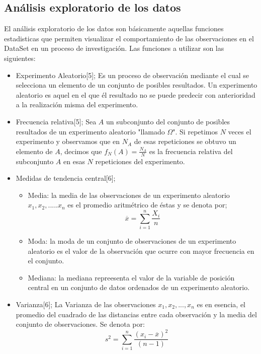   
  \subsection{Análisis exploratorio de los datos}
  
  El análisis exploratorio de los datos son básicamente aquellas funciones estadisticas que permiten visualizar el comportamiento de las observaciones en el DataSet en un proceso de investigación. Las funciones a utilizar son las siguientes: 
  \begin{itemize}
  	\item Experimento Aleatorio[5]; Es un proceso de observación mediante el cual se selecciona un elemento de un conjunto de posibles resultados. Un experimento aleatorio es aquel en el que él resultado no se puede predecir con anterioridad a la realización misma del experimento. 
  	
   \item Frecuencia relativa[5]; Sea $A$ un subconjunto del conjunto de posibles resultados de un experimento aleatorio "llamado $\Omega$". Si repetimos $N$ veces el experimento y observamos que en $N_{A}$ de esas repeticiones se obtuvo un elemento de $A$, decimos que $f_{N}(A)=\frac{N_{A}}{N}$ es la frecuencia relativa del subconjunto $A$ en esas $N$  repeticiones del experimento.

    \item Medidas de tendencia central[6]; 
	   \begin{itemize}
		 	\item Media: la media de las observaciones de un experimento aleatorio $x_{1},x_{2},.....x_{n}$ es el promedio aritm\'etrico de \'estas y se denota por;
		 	$$\overline{x}=\sum_{i=1}^{n} \frac{X_{i}}{n}$$ 
		 	\item Moda: la moda de un conjunto de observaciones de un experimento aleatorio es el valor de la observaci\'on que ocurre con mayor frecuencia en el conjunto.
		 	\item Mediana: la mediana repreesenta el valor de la variable de posición central en un conjunto de datos ordenados de un experimento aleatorio.
		 \end{itemize}
 
	 \item Varianza[6]; La Varianza de las observaciones $x_{1},x_{2},...,x_{n}$ es en esencia, el promedio del cuadrado de las distancias entre cada observaci\'on y la media del conjunto de observaciones. Se denota por:
	 $$s^{2}=\sum_{i=1}^{n} \frac{ \left( x_{i}-\overline{x}\right)^{2}}{\left(n-1 \right) } $$ 
 

\end{itemize}
